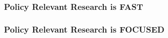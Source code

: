 \documentclass[12pt,handout]{beamer}
\begin{document}
{
\begin{frame}[plain]
\frametitle{Policy Relevant Research is FAST}
\end{frame}
}

{
\begin{frame}[plain]
\frametitle{Policy Relevant Research is FOCUSED}
\end{frame}
}
\end{document}
